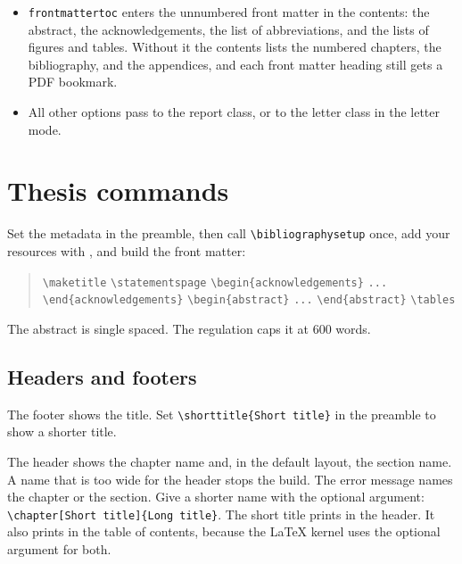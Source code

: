 \documentclass[dissertation,tables,glossary,12pt,a4paper]{bangor}
\begin{document}
\begin{itemize}
  \item \verb|frontmattertoc| enters the unnumbered front matter in the contents: the abstract, the acknowledgements, the list of abbreviations, and the lists of figures and tables. Without it the contents lists the numbered chapters, the bibliography, and the appendices, and each front matter heading still gets a PDF bookmark.
  \item All other options pass to the \textsf{report} class, or to the \textsf{letter} class in the letter mode.
\end{itemize}

\chapter{Thesis commands}
Set the metadata in the preamble, then call \verb|\bibliographysetup| once, add your resources with \verb||, and build the front matter:

\begin{quote}
  \verb|\maketitle| \quad \verb|\statementspage| \quad \verb|\begin{acknowledgements}| \verb|...| \verb|\end{acknowledgements}| \quad \verb|\begin{abstract}| \verb|...| \verb|\end{abstract}| \quad \verb|\tables|
\end{quote}

The abstract is single spaced. The regulation caps it at 600 words.

\section{Headers and footers}
The footer shows the title. Set \verb|\shorttitle{Short title}| in the preamble to show a shorter title.

The header shows the chapter name and, in the default layout, the section name. A name that is too wide for the header stops the build. The error message names the chapter or the section. Give a shorter name with the optional argument: \verb|\chapter[Short title]{Long title}|. The short title prints in the header. It also prints in the table of contents, because the LaTeX kernel uses the optional argument for both.
\end{document}
